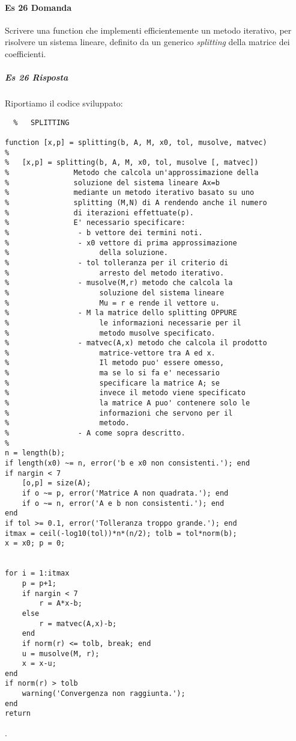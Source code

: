 \documentclass[a4paper]{report}
\begin{document}
\paragraph{Es 26 Domanda}
Scrivere una function che implementi efficientemente un metodo iterativo, per risolvere un sistema lineare, definito da un generico \emph{splitting} della matrice dei coefficienti.
\subparagraph{Es 26 Risposta}
Riportiamo il codice sviluppato:\\
\begin{lstlisting}	%	SPLITTING

function [x,p] = splitting(b, A, M, x0, tol, musolve, matvec)
%
%   [x,p] = splitting(b, A, M, x0, tol, musolve [, matvec])
%               Metodo che calcola un'approssimazione della
%               soluzione del sistema lineare Ax=b
%               mediante un metodo iterativo basato su uno
%               splitting (M,N) di A rendendo anche il numero
%               di iterazioni effettuate(p).
%               E' necessario specificare:
%                - b vettore dei termini noti.
%                - x0 vettore di prima approssimazione
%                     della soluzione.
%                - tol tolleranza per il criterio di
%                     arresto del metodo iterativo.
%                - musolve(M,r) metodo che calcola la
%                     soluzione del sistema lineare
%                     Mu = r e rende il vettore u.
%                - M la matrice dello splitting OPPURE
%                     le informazioni necessarie per il
%                     metodo musolve specificato.
%                - matvec(A,x) metodo che calcola il prodotto
%                     matrice-vettore tra A ed x.
%                     Il metodo puo' essere omesso,
%                     ma se lo si fa e' necessario
%                     specificare la matrice A; se
%                     invece il metodo viene specificato
%                     la matrice A puo' contenere solo le
%                     informazioni che servono per il
%                     metodo.
%                - A come sopra descritto.
%                     
n = length(b);
if length(x0) ~= n, error('b e x0 non consistenti.'); end
if nargin < 7
	[o,p] = size(A);
	if o ~= p, error('Matrice A non quadrata.'); end
	if o ~= n, error('A e b non consistenti.'); end
end
if tol >= 0.1, error('Tolleranza troppo grande.'); end
itmax = ceil(-log10(tol))*n*(n/2); tolb = tol*norm(b);
x = x0; p = 0;


for i = 1:itmax
	p = p+1;
	if nargin < 7
		r = A*x-b;
	else
		r = matvec(A,x)-b;
	end
	if norm(r) <= tolb, break; end
	u = musolve(M, r);
	x = x-u;
end
if norm(r) > tolb
	warning('Convergenza non raggiunta.');
end
return
\end{lstlisting}
.\\
\end{document}
